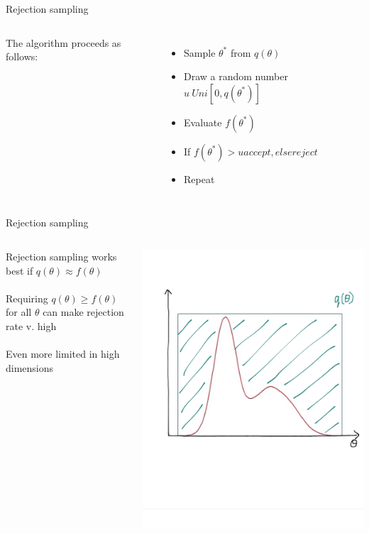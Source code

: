 \documentclass[compress]{beamer}
\begin{document}
\begin{frame}[label=sec-5-8]{Rejection sampling}
\begin{columns}[c]
The algorithm proceeds as follows:\\
\begin{itemize}
\item Sample $\theta^*$ from $q(\theta)$
\item Draw a random number $u ~ Uni[0, q(\theta^*)]$
\item Evaluate $f(\theta^*)$
\item If $f(\theta^*) > u accept, else reject$
\item Repeat
\end{itemize}
\end{columns}
\end{frame}

\begin{frame}[label=sec-5-9]{Rejection sampling}
\begin{columns}[c] 
Rejection sampling works best if $q(\theta) \approx f(\theta)$ \\
\\
Requiring $q(\theta) \geqslant f(\theta)$ for all $\theta$ can make rejection rate v. high\\
\\
Even more limited in high dimensions

\includegraphics[width=.8\linewidth]{RS23.png}
\end{columns}
\end{frame}
\end{document}
